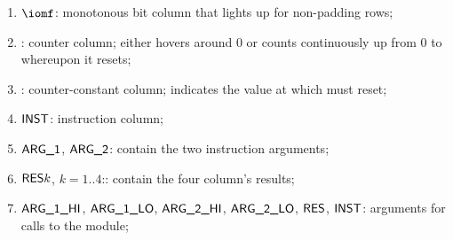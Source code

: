 \begin{enumerate}
	\item $\iomf$:
	monotonous bit column that lights up for non-padding rows;
	 \item \ct{}:
	counter column; 
	either hovers around $0$ or counts continuously up from $0$ to \maxCt{} whereupon it resets;
    \item \maxCt:
	counter-constant column;
	indicates the value at which \ct{} must reset;
	\item $\textsf{INST}{}$:
	\godGiven{}
	instruction column;
    \item $\textsf{ARG}\textsf{\_1}$, $\textsf{ARG}\textsf{\_2}$:
	\godGiven{}
	contain the two instruction arguments;
	\item $\textsf{RES}{k}$, $k=1..4$::
	contain the four column's results;
	\item $\textsf{ARG}\textsf{\_1}\textsf{\_HI}$, $\textsf{ARG}\textsf{\_1}\textsf{\_LO}$, $\textsf{ARG}\textsf{\_2}\textsf{\_HI}$, $\textsf{ARG}\textsf{\_2}\textsf{\_LO}$, $\textsf{RES}$, $\textsf{INST}$:
	arguments for calls to the \wcpMod{} module;
\end{enumerate}